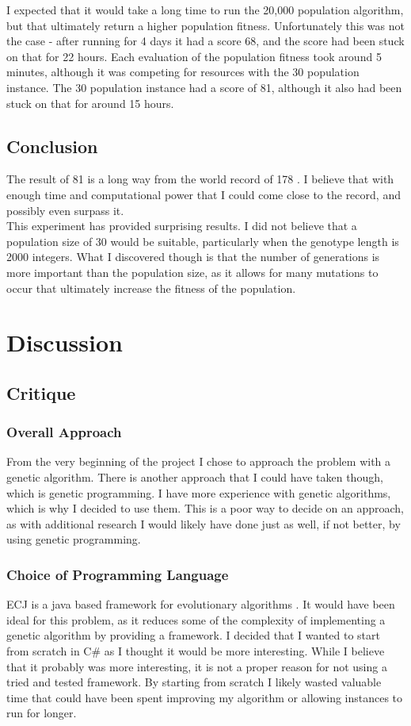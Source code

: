 \documentclass[]{report}
\begin{document}
I expected that it would take a long time to run the 20,000 population algorithm, but that ultimately return a higher population fitness. Unfortunately this was not the case - after running for 4 days it had a score 68, and the score had been stuck on that for 22 hours. Each evaluation of the population fitness took around 5 minutes, although it was competing for resources with the 30 population instance. The 30 population instance had a score of 81, although it also had been stuck on that for around 15 hours.

\section{Conclusion}
The result of 81 is a long way from the world record of 178 \cite{morpionRecord}. I believe that with enough time and computational power that I could come close to the record, and possibly even surpass it.\\

This experiment has provided surprising results. I did not believe that a population size of 30 would be suitable, particularly when the genotype length is 2000 integers. What I discovered though is that the number of generations is more important than the population size, as it allows for many mutations to occur that ultimately increase the fitness of the population. 

\chapter{Discussion}
\section{Critique}
\subsection{Overall Approach}
From the very beginning of the project I chose to approach the problem with a genetic algorithm. There is another approach that I could have taken though, which is genetic programming. I have more experience with genetic algorithms, which is why I decided to use them. This is a poor way to decide on an approach, as with additional research I would likely have done just as well, if not better, by using genetic programming.

\subsection{Choice of Programming Language}
ECJ is a java based framework for evolutionary algorithms \cite{something}. It would have been ideal for this problem, as it reduces some of the complexity of implementing a genetic algorithm by providing a framework. I decided that I wanted to start from scratch in C\# as I thought it would be more interesting. While I believe that it probably was more interesting, it is not a proper reason for not using a tried and tested framework. By starting from scratch I likely wasted valuable time that could have been spent improving my algorithm or allowing instances to run for longer.
\end{document}
